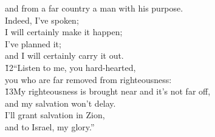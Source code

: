 \begin{poetry}
\poemll    and from a far country a man with his purpose. \\
\poeml Indeed, I've spoken; \\
\poemll    I will certainly make it happen; \\
\poeml I've planned it; \\
\poemll    and I will certainly carry it out. \\
\poeml \v{12}``Listen to me, you hard-hearted, \\
\poemll    you who are far removed from righteousness: \\
\poeml \v{13}My righteousness is brought near and it's not far off, \\
\poemll    and my salvation won't delay. \\
\poeml I'll grant salvation in Zion, \\
\poemll    and to Israel, my glory.''
\end{poetry}


